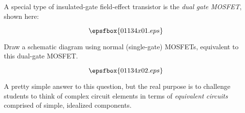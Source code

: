 

A special type of insulated-gate field-effect transistor is the {\it dual gate MOSFET}, shown here:

$$\epsfbox{01134x01.eps}$$

Draw a schematic diagram using normal (single-gate) MOSFETs, equivalent to this dual-gate MOSFET.

\vskip 30pt







$$\epsfbox{01134x02.eps}$$







A pretty simple answer to this question, but the real purpose is to challenge students to think of complex circuit elements in terms of {\it equivalent circuits} comprised of simple, idealized components.




